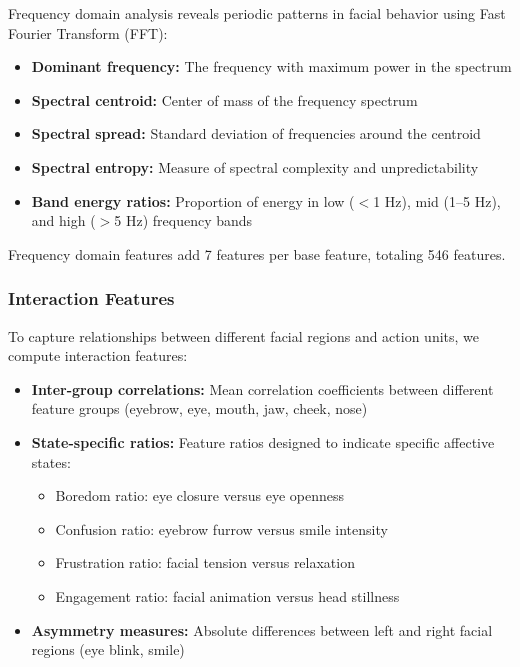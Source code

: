 \documentclass[11pt,a4paper]{article}
\begin{document}
Frequency domain analysis reveals periodic patterns in facial behavior using Fast Fourier Transform (FFT):

\begin{itemize}
  \item \textbf{Dominant frequency:} The frequency with maximum power in the spectrum
  \item \textbf{Spectral centroid:} Center of mass of the frequency spectrum
  \item \textbf{Spectral spread:} Standard deviation of frequencies around the centroid
  \item \textbf{Spectral entropy:} Measure of spectral complexity and unpredictability
  \item \textbf{Band energy ratios:} Proportion of energy in low ($<$1 Hz), mid (1--5 Hz), and high ($>$5 Hz) frequency bands
\end{itemize}

Frequency domain features add 7 features per base feature, totaling 546 features.

\subsubsection{Interaction Features}

To capture relationships between different facial regions and action units, we compute interaction features:

\begin{itemize}
  \item \textbf{Inter-group correlations:} Mean correlation coefficients between different feature groups (eyebrow, eye, mouth, jaw, cheek, nose)
  \item \textbf{State-specific ratios:} Feature ratios designed to indicate specific affective states:
    \begin{itemize}
      \item Boredom ratio: eye closure versus eye openness
      \item Confusion ratio: eyebrow furrow versus smile intensity
      \item Frustration ratio: facial tension versus relaxation
      \item Engagement ratio: facial animation versus head stillness
    \end{itemize}
  \item \textbf{Asymmetry measures:} Absolute differences between left and right facial regions (eye blink, smile)
\end{itemize}
\end{document}
